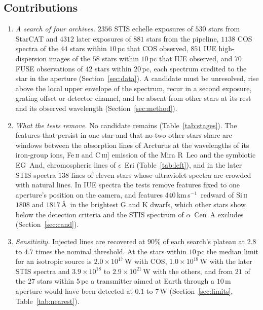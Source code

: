 \documentclass[3p,11pt]{elsarticle}
\newcommand{\kms}{km\,s$^{-1}$}
\newcommand{\sci}[2]{#1\times10^{#2}}
\newcommand{\ion}[2]{#1\,\textsc{#2}}
\begin{document}
\subsection{Contributions}

\begin{enumerate}[leftmargin=*,itemsep=1pt]
\item \emph{A search of four archives.} $2356$ STIS echelle exposures of $530$ stars
from StarCAT and $4312$ later exposures of $881$ stars from the pipeline, $1138$ COS
spectra of the $44$ stars within $10$\,pc that COS observed, $851$ IUE
high-dispersion images of the $58$ stars within $10$\,pc that IUE observed, and $70$
FUSE observations of $42$ stars within $20$\,pc, each spectrum credited to the star in
the aperture (Section~\ref{sec:data}). A candidate must be unresolved, rise above the
local upper envelope of the spectrum, recur in a second exposure, grating offset or
detector channel, and be absent from other stars at its rest and its observed wavelength
(Section~\ref{sec:method}).
\item \emph{What the tests remove.} No candidate remains (Table~\ref{tab:stages}). The
features that persist in one star and that no two other stars share are windows between
the absorption lines of Arcturus at the wavelengths of its iron-group ions,
\ion{Fe}{ii} and C\,\textsc{iii}] emission of the Mira R~Leo and the
symbiotic EG~And, chromospheric lines of $\epsilon$~Eri (Table~\ref{tab:left}), and in
the later STIS spectra $138$ lines of eleven stars whose ultraviolet spectra are crowded
with natural lines. In
IUE spectra the tests remove features fixed to one aperture's position on the camera,
and features $440$\,\kms\ redward of \ion{Si}{ii} $1808$ and $1817$\,\AA\ in the
brightest G and K dwarfs, which other stars show below the detection criteria and the
STIS spectrum of $\alpha$~Cen~A excludes (Section~\ref{sec:cand}).
\item \emph{Sensitivity.} Injected lines are recovered at $90\%$ of each search's plateau
at $2.8$ to $4.7$ times the nominal threshold. At the stars within $10$\,pc the median
limit for an isotropic source is $\sci{2.0}{17}$\,W with COS, $\sci{1.0}{18}$\,W with the
later STIS spectra and $\sci{3.9}{18}$ to $\sci{2.9}{21}$\,W with the others, and from
$21$ of the $27$ stars within $5$\,pc a transmitter aimed at Earth through a $10$\,m
aperture would have been detected at $0.1$ to $7$\,W (Section~\ref{sec:limits},
Table~\ref{tab:nearest}).
\end{enumerate}
\end{document}
